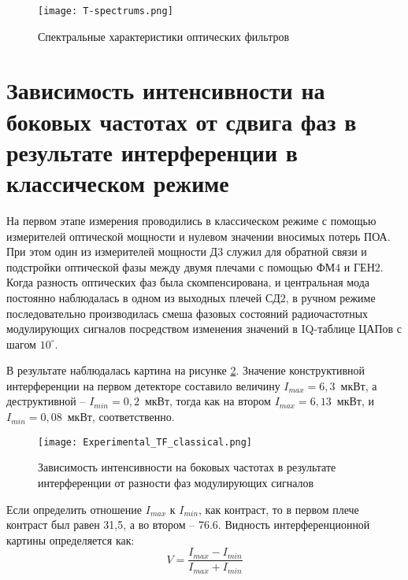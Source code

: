  \begin{figure}[ht]
  \centering
  \texttt{[image: T-spectrums.png]}
  \caption{Спектральные характеристики оптических фильтров}
  \label{fig:Spectrums}
\end{figure}

\pagebreak




\section{Зависимость интенсивности на боковых частотах от сдвига фаз в результате интерференции в классическом режиме} \label{ch:ch5/sec5}


На первом этапе измерения проводились в классическом режиме с помощью измерителей оптической мощности и нулевом значении вносимых потерь ПОА. При этом один из измерителей мощности $Д3$ служил для обратной связи и подстройки оптической фазы между двумя плечами с помощью $ФМ4$ и $ГЕН2$. Когда разность оптических фаз была скомпенсирована, и центральная мода постоянно наблюдалась в одном из выходных плечей $СД2$, в ручном режиме последовательно производилась смеша фазовых состояний радиочастотных модулирующих сигналов посредством изменения значений в IQ-таблице ЦАПов с шагом $10^{\circ}$. 

В результате наблюдалась картина на рисунке \ref{fig:Experimental_TF_classical}. Значение конструктивной интерференции на первом детекторе составило величину $I_{max}=6,3$~мкВт, а деструктивной -- $I_{min}=0,2$~мкВт, тогда как на втором $I_{max}=6,13$~мкВт, и $I_{min}=0,08$~мкВт, соответственно. 

 \begin{figure}[ht]
  \centering
  \texttt{[image: Experimental\_TF\_classical.png]}
  \caption{Зависимость интенсивности на боковых частотах в результате интерференции от разности фаз модулирующих сигналов}
  \label{fig:Experimental_TF_classical}
\end{figure}

Если определить отношение $I_{max}$ к $I_{min}$, как контраст, то в первом плече контраст был равен 31,5, а во втором -- 76.6. Видность интерференционной картины определяется как: 
\begin{equation}
	V=\frac{I_{max}-I_{min}}{I_{max}+I_{min}}
\end{equation}

